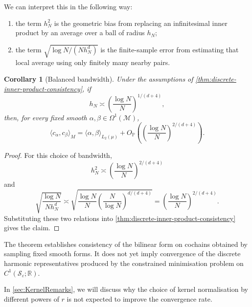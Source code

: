 \documentclass[a4paper,11pt, DIV=10]{scrartcl}
\numberwithin{equation}{section}
\newtheorem{corollary}[theorem]{Corollary}
\theoremstyle{definition}
\theoremstyle{remark}
\newcommand{\R}{\mathbb{R}}
\newcommand{\mc}[1]{\mathcal{#1}}
\begin{document}
We can interpret this in the following way:
\begin{enumerate}
\item the term $h_N^2$ is the geometric bias from replacing an infinitesimal inner product by an average over a ball of radius $h_N$;
\item the term $\sqrt{\log N/(N h_N^d)}$ is the finite-sample error from estimating that local average using only finitely many nearby pairs.
\end{enumerate}

\begin{corollary}[Balanced bandwidth]
Under the assumptions of \cref{thm:discrete-inner-product-consistency}, if
\begin{equation}
h_N\asymp \left(\frac{\log N}{N}\right)^{1/(d+4)},
\end{equation}
then, for every fixed smooth $\alpha,\beta\in \Omega^1(\mc{M})$,
\begin{equation}
\langle c_\alpha,c_\beta\rangle_M
=
\langle \alpha,\beta\rangle_{L_2(\mu)}
+ O_{\mathbb P}\!\left(\left(\frac{\log N}{N}\right)^{2/(d+4)}\right).
\end{equation}
\end{corollary}
\begin{proof}
For this choice of bandwidth,
\begin{equation}
h_N^2\asymp \left(\frac{\log N}{N}\right)^{2/(d+4)}
\end{equation}
and
\begin{equation}
\sqrt{\frac{\log N}{N h_N^d}}
\asymp
\sqrt{
\frac{\log N}{N}
\left(\frac{N}{\log N}\right)^{d/(d+4)}
}
=
\left(\frac{\log N}{N}\right)^{2/(d+4)}.
\end{equation}
Substituting these two relations into \cref{thm:discrete-inner-product-consistency} gives the claim.
\end{proof}

The theorem establishes consistency of the bilinear form on cochains obtained by sampling fixed smooth forms. It does not yet imply convergence of the discrete harmonic representatives produced by the constrained minimisation problem on $C^1(\mc{S}_\varepsilon;\R)$.

In \cref{sec:KernelRemarks}, we will discuss why the choice of kernel normalisation by different powers of $r$ is not expected to improve the convergence rate.
\end{document}
